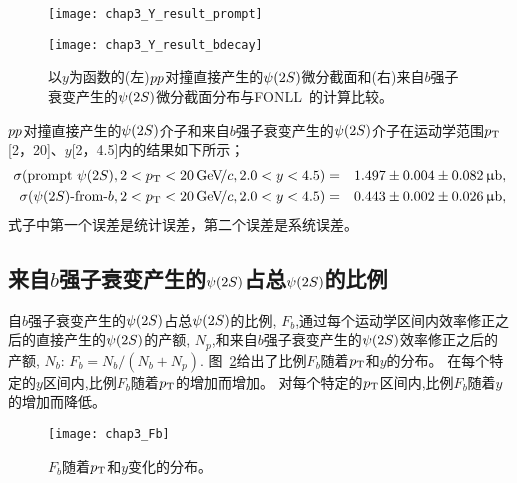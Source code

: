\begin{figure}[!tbp]
\centering
\begin{minipage}[t]{0.49\textwidth}
\centering
\texttt{[image: chap3\_Y\_result\_prompt]}
\end{minipage}
\begin{minipage}[t]{0.49\textwidth}
\centering
\texttt{[image: chap3\_Y\_result\_bdecay]}
\end{minipage}
\caption{以$y$为函数的(左)${pp}$对撞直接产生的${\psi{(2S)}}$微分截面和(右)来自$b$强子衰变产生的${\psi{(2S)}}$微分截面分布与FONLL~\cite{Cacciari:1998it}的计算比较。}
\label{fig:results_Y}
\end{figure}

${pp}$对撞直接产生的${\psi{(2S)}}$介子和来自$b$强子衰变产生的${\psi{(2S)}}$介子在运动学范围$\mbox{$p_{\mathrm{ T}}$}$[2，20]、$y$[2，4.5]内的结果如下所示；
\begin{eqnarray*}
\sigma(\mathrm{prompt}~ {\psi{(2S)}}, 2<\mbox{$p_{\mathrm{ T}}$}<20{\mathrm{\,Ge\kern -0.1em V\!/}c},2.0<y<4.5) &=& 1.497\pm0.004\pm0.082{\mathrm{ \,\upmu b}},\\
\sigma({\psi{(2S)}}\text{-from-}{\ensuremath{b}}, 2<\mbox{$p_{\mathrm{ T}}$}<20{\mathrm{\,Ge\kern -0.1em V\!/}c},2.0<y<4.5) &=& 0.443\pm0.002\pm0.026{\mathrm{ \,\upmu b}},
\end{eqnarray*}
式子中第一个误差是统计误差，第二个误差是系统误差。

\subsection{来自$b$强子衰变产生的${\psi{(2S)}}$占总${\psi{(2S)}}$的比例}
\label{sec:Fb}
自$b$强子衰变产生的${\psi{(2S)}}$占总${\psi{(2S)}}$的比例, $F_b$,通过每个运动学区间内效率修正之后的直接产生的${\psi{(2S)}}$的产额, $N_p$,和来自$b$强子衰变产生的${\psi{(2S)}}$效率修正之后的产额, $N_b$: $F_b=N_b/(N_b+N_p)$.
图~\ref{fig:Fb}给出了比例$F_b$随着$\mbox{$p_{\mathrm{ T}}$}$和$y$的分布。
在每个特定的$y$区间内,比例$F_b$随着$\mbox{$p_{\mathrm{ T}}$}$的增加而增加。
对每个特定的$\mbox{$p_{\mathrm{ T}}$}$区间内,比例$F_b$随着$y$的增加而降低。

\begin{figure}[!tbp]
\centering
\texttt{[image: chap3\_Fb]}
\caption{$F_b$随着$\mbox{$p_{\mathrm{ T}}$}$和$y$变化的分布。}
\label{fig:Fb}
\end{figure}


